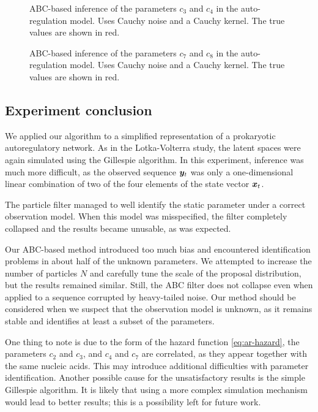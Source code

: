 \begin{figure}[htp]%
    \centering
    \qquad
    \caption{ABC-based inference of the parameters $c_3$ and $c_4$ in the auto-regulation model. Uses Cauchy noise and a Cauchy kernel. The true values are shown in red.}%
    \label{fig:ar-abcmh-cauchy-cauchy-2}%
\end{figure}

\begin{figure}[htp]%
    \centering
    \qquad
    \caption{ABC-based inference of the parameters $c_7$ and $c_8$ in the auto-regulation model. Uses Cauchy noise and a Cauchy kernel. The true values are shown in red.}%
    \label{fig:ar-abcmh-cauchy-cauchy-3}%
\end{figure}


\subsection{Experiment conclusion}
We applied our algorithm to a simplified representation of a prokaryotic autoregulatory network. As in the Lotka-Volterra study, the latent spaces were again simulated using the Gillespie algorithm. In this experiment, inference was much more difficult, as the observed sequence $\bm{y}_t$ was only a one-dimensional linear combination of two of the four elements of the state vector $\bm{x}_t$.

The particle filter managed to well identify the static parameter under a correct observation model. When this model was misspecified, the filter completely collapsed and the results became unusable, as was expected.

Our ABC-based method introduced too much bias and encountered identification problems in about half of the unknown parameters. We attempted to increase the number of particles $N$ and carefully tune the scale of the proposal distribution, but the results remained similar. Still, the ABC filter does not collapse even when applied to a sequence corrupted by heavy-tailed noise. Our method should be considered when we suspect that the observation model is unknown, as it remains stable and identifies at least a subset of the parameters.

One thing to note is due to the form of the hazard function \eqref{eq:ar-hazard}, the parameters $c_2$ and $c_3$, and $c_4$ and $c_7$ are correlated, as they appear together with the same nucleic acids. This may introduce additional difficulties with parameter identification. Another possible cause for the unsatisfactory results is the simple Gillespie algorithm. It is likely that using a more complex simulation mechanism would lead to better results; this is a possibility left for future work.
